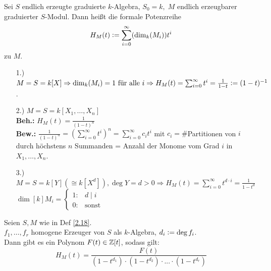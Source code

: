 \documentclass[a4paper, 10pt]{report}
\begin{document}
\begin{Def}
\label{2.18}
  Sei $S$ endlich erzeugte graduierte $k$-Algebra, $S_0 = k,\; M$ endlich
  erzeugbarer graduierter $S$-Modul. Dann heißt die formale Potenzreihe $$H_M(t)
  \defeqr \sum_{i=0}^{\infty} (\dim[k]{M_i}) t^i$$
   zu $M$.
\end{Def}

\begin{nnBsp}
  \begin{enumerate}
    \item[1.)] $M = S = k[X] \Rightarrow \dim[k]{M_i} = 1 \text{ für alle }i
               \Rightarrow H_M(t) = \sum_{i=0}^{\infty}t^i = \frac{1}{1-t}
               \defeqr (1-t)^{-1}$.
    \item[2.)] $M = S = k[X_1, \dots, X_n]$\\
               \textbf{Beh.:} $H_M(t) = \frac{1}{(1-t)^n}$\\
               \textbf{Bew.:} $\frac{1}{(1-t)^n} = \left( \sum_{i=0}^{\infty}
               t^i\right)^n = \sum_{i=0}^{\infty} c_i t^i$ mit $c_i =
               \#$Partitionen von $i$ durch höchstens $n$ Summanden = Anzahl der
               Monome vom Grad $i$ in $X_1, \dots, X_n$.
    \item[3.)] $M = S = k[Y] (\cong k[X^d]), \deg{Y} = d > 0 \Rightarrow
               H_M(t) = \sum_{i = 0}^{\infty} t^{d \cdot i} = \frac{1}{1-t^d}$\\
               $\dim[k]{M_i} = \begin{cases}1: & d \mid i\\ 0: & \text{sonst} \end{cases}$
  \end{enumerate}
\end{nnBsp}

\begin{nnSatz}
  Seien $S, M$ wie in Def \ref{2.18}.\\
  $f_1, \dots, f_r$ homogene Erzeuger von $S$ als $k$-Algebra, $d_i \mathrel{\mathop:}=
  \deg{f_i}$.\\
  Dann gibt es ein Polynom $F(t) \in \mathbb{Z}[t]$, sodass gilt:
  $$ H_M(t) = \frac{F(t)}{(1-t^{d_1}) \cdot (1-t^{d_2}) \cdot ... \cdot 
  (1-t^{d_r})}$$
\end{nnSatz}
\end{document}
